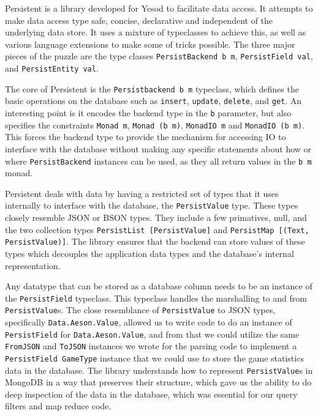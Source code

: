 \documentclass[letterpaper,twocolumn,9pt]{article}
\newcommand{\code}[1]{\texttt{#1}}
\begin{document}
Persistent\cite{persistent} is a library developed for Yesod to facilitate data access.  It attempts to make data access type safe, concise, declarative and independent of the underlying data store.  It uses a mixture of typeclasses to achieve this, as well as various language extensions to make some of tricks possible.  The three major pieces of the puzzle are the type classes \code{PersistBackend b m}, \code{PersistField val}, and \code{PersistEntity val}.

The core of Persistent is the \code{Persistbackend b m} typeclass, which defines the basic operations on the database such as \code{insert}, \code{update}, \code{delete}, and \code{get}.  An interesting point is it encodes the backend type in the \code{b} parameter, but also specifies the constraints \code{Monad m}, \code{Monad (b m)}, \code{MonadIO m} and \code{MonadIO (b m)}.  This forces the backend type to provide the mechanism for accessing IO to interface with the database without making any specific statements about how or where \code{PersistBackend} instances can be used, as they all return values in the \code{b m} monad.

Persistent deals with data by having a restricted set of types that it uses internally to interface with the database, the \code{PersistValue} type.  These types closely resemble JSON or BSON types.  They include a few primatives, null, and the two collection types \code{PersistList [PersistValue]} and \code{PersistMap [(Text, PersistValue)]}.  The library ensures that the backend can store values of these types which decouples the application data types and the database's internal representation.

Any datatype that can be stored as a database column needs to be an instance of the \code{PersistField} typeclass.  This typeclass handles the marshalling to and from \code{PersistValue}s.  The close resemblance of \code{PersistValue} to JSON types, specifically \code{Data.Aeson.Value}, allowed us to write code to do an instance of \code{PersistField} for \code{Data.Aeson.Value}, and from that we could utilize the same \code{FromJSON} and \code{ToJSON} instances we wrote for the parsing code to implement a \code{PersistField GameType} instance that we could use to store the game statistics data in the database.  The library understands how to represent \code{PersistValue}s in MongoDB in a way that preserves their structure, which gave us the ability to do deep inspection of the data in the database, which was essential for our query filters and map reduce code.
\end{document}
